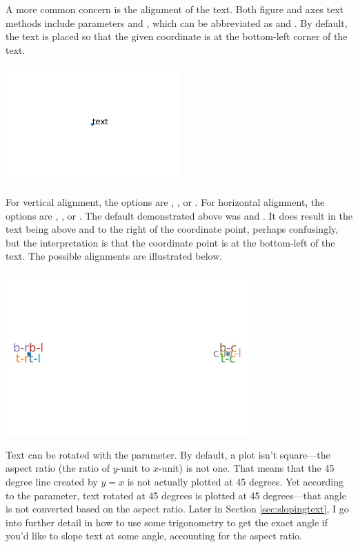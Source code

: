 A more common concern is the alignment of the text. Both figure and axes text methods include parameters  and , which can be abbreviated as  and . By default, the text is placed so that the given coordinate is at the bottom-left corner of the text. 


\begin{center}
    \includegraphics[width = 0.5\textwidth]{figures/proseplots/text-default-align.pdf}
\end{center}

\noindent For vertical alignment, the options are , , or . For horizontal alignment, the options are , , or . The default demonstrated above was  and . It does result in the text being above and to the right of the coordinate point, perhaps confusingly, but the interpretation is that the coordinate point is at the bottom-left of the text. The possible alignments are illustrated below. 


\begin{center}
    \includegraphics[width = 0.7\textwidth]{figures/proseplots/text-align.pdf}
\end{center}


Text can be rotated with the  parameter. By default, a plot isn't square---the aspect ratio (the ratio of $y$-unit to $x$-unit) is not one. That means that the 45 degree line created by $y=x$ is not actually plotted at 45 degrees. Yet according to the  parameter, text rotated at 45 degrees is plotted at 45 degrees---that angle is not converted based on the aspect ratio. Later in Section \ref{sec:slopingtext}, I go into further detail in how to use some trigonometry to get the exact angle if you'd like to slope text at some angle, accounting for the aspect ratio. 

